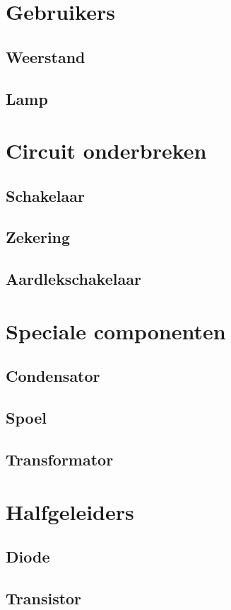 \documentclass[a4paper,12pt,twoside,openright,titlepage]{book}
\begin{document}
\chapter{Gebruikers}

\section{Weerstand}

\section{Lamp}


\chapter{Circuit onderbreken}
\section{Schakelaar}

\section{Zekering}

\section{Aardlekschakelaar}


\chapter{Speciale componenten}
\section{Condensator}

\section{Spoel}

\section{Transformator}


\chapter{Halfgeleiders}
\section{Diode}

\section{Transistor}



\backmatter
\printindex
\end{document}
